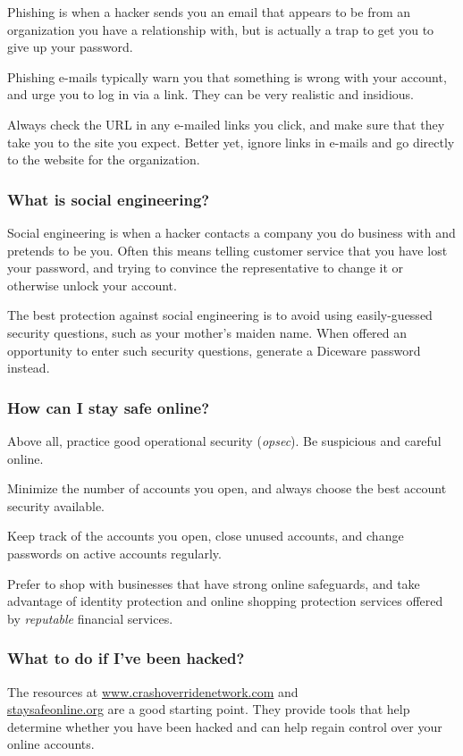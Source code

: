 Phishing is when a hacker sends you an email that appears to be from an organization you have a relationship with, but is actually a trap to get you to give up your password.

Phishing e-mails typically warn you that something is wrong with your account, and urge you to log in via a link. They can be very realistic and insidious.

Always check the URL in any e-mailed links you click, and make sure that they take you to the site you expect. Better yet, ignore links in e-mails and go directly to the website for the organization.

\subsubsection{What is social engineering?}

Social engineering is when a hacker contacts a company you do business with and pretends to be you. Often this means telling customer service that you have lost your password, and trying to convince the representative to change it or otherwise unlock your account.

The best protection against social engineering is to avoid using easily-guessed security questions, such as your mother's maiden name. When offered an opportunity to enter such security questions, generate a Diceware password instead.

\subsubsection{How can I stay safe online?}

Above all, practice good operational security (\textit{opsec}). Be suspicious and careful online.

Minimize the number of accounts you open, and always choose the best account security available.

Keep track of the accounts you open, close unused accounts, and change passwords on active accounts regularly.

Prefer to shop with businesses that have strong online safeguards, and take advantage of identity protection and online shopping protection services offered by \textit{reputable} financial services.

\subsubsection{What to do if I've been hacked?}

The resources at \url{www.crashoverridenetwork.com} and \\  \url{staysafeonline.org} are a good starting point. They provide tools that help determine whether you have been hacked and can help regain control over your online accounts.

